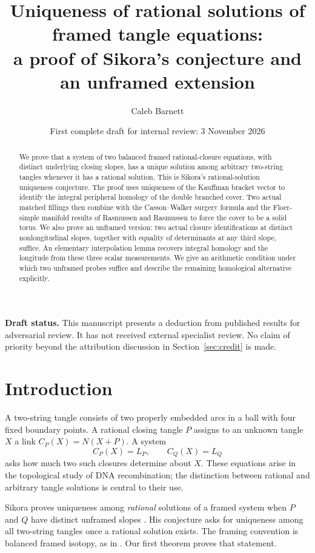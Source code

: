 \documentclass[11pt]{amsart}
\title[Rational solutions of tangle equations]{Uniqueness of rational solutions of framed tangle equations:\\ a proof of Sikora's conjecture and an unframed extension}
\author{Caleb Barnett}
\date{First complete draft for internal review: 3 November 2026}
\theoremstyle{definition}
\theoremstyle{remark}
\newcommand{\cl}[2]{C_{#1}(#2)}
\begin{document}
\begin{abstract}
We prove that a system of two balanced framed rational-closure equations,
with distinct underlying closing slopes, has a unique solution among
arbitrary two-string tangles whenever it has a rational solution.
This is Sikora's rational-solution uniqueness conjecture.
The proof uses uniqueness of the Kauffman bracket vector to identify the
integral peripheral homology of the double branched cover. Two actual
matched fillings then combine with the Casson--Walker surgery formula
and the Floer-simple manifold results of Rasmussen and Rasmussen to force
the cover to be a solid torus. We also prove an unframed version: two
actual closure identifications at distinct nonlongitudinal slopes,
together with equality of determinants at any third slope, suffice.
An elementary interpolation lemma recovers integral homology and the
longitude from these three scalar measurements. We give an arithmetic
condition under which two unframed probes suffice and describe the
remaining homological alternative explicitly.
\end{abstract}
\maketitle

\noindent\textbf{Draft status.}
This manuscript presents a deduction from published results for
adversarial review. It has not received external specialist review.
No claim of priority beyond the attribution discussion in
Section~\ref{sec:credit} is made.

\section{Introduction}\label{sec:intro}

A two-string tangle consists of two properly embedded arcs in a ball
with four fixed boundary points. A rational closing tangle \(P\)
assigns to an unknown tangle \(X\) a link
\(\cl P X=N(X+P)\). A system
\begin{equation}\label{eq:system}
 \cl P X=L_P,\qquad \cl Q X=L_Q
\end{equation}
asks how much two such closures determine about \(X\).
These equations arise in the topological study of DNA recombination;
the distinction between rational and arbitrary tangle solutions is
central to their use.

Sikora proves uniqueness among \emph{rational} solutions of a framed
system when \(P\) and \(Q\) have distinct unframed slopes
\cite[Proposition~1]{Sikora}. His conjecture asks for uniqueness among
all two-string tangles once a rational solution exists. The framing
convention is balanced framed isotopy, as in \cite[Section~4]{Sikora}.
Our first theorem proves that statement.
\end{document}

